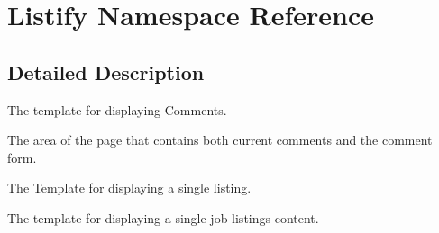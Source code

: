 \hypertarget{namespace_listify}{}\section{Listify Namespace Reference}
\label{namespace_listify}


\subsection{Detailed Description}
The template for displaying Comments.

The area of the page that contains both current comments and the comment form.

The Template for displaying a single listing.

The template for displaying a single job listings\textquotesingle{} content. 